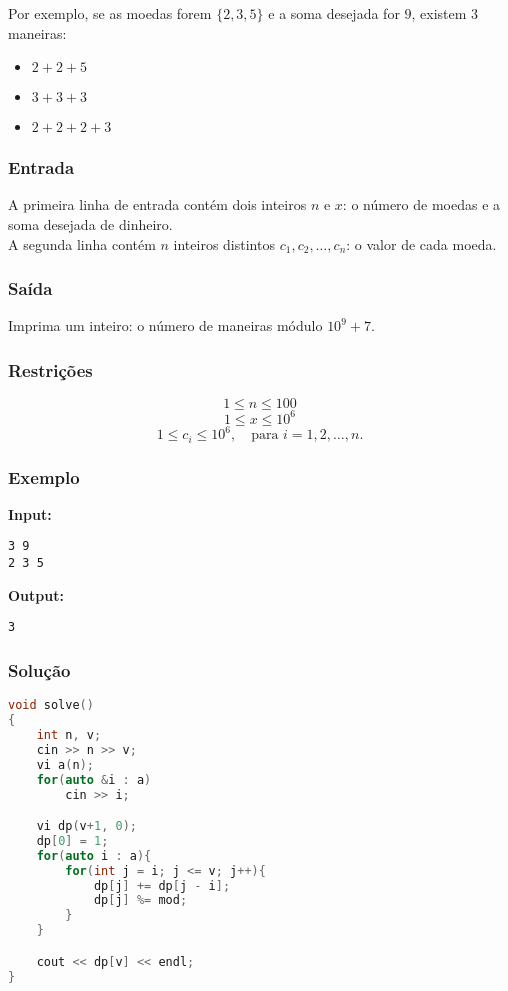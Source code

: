 Por exemplo, se as moedas forem \(\{2,3,5\}\) e a soma desejada for \(9\), existem \(3\) maneiras:
\begin{itemize}
    \item \(2+2+5\)
    \item \(3+3+3\)
    \item \(2+2+2+3\)
\end{itemize}

\subsubsection*{Entrada}
A primeira linha de entrada contém dois inteiros \( n \) e \( x \): o número de moedas e a soma desejada de dinheiro.\\  
A segunda linha contém \( n \) inteiros distintos \( c_1, c_2, \dots, c_n \): o valor de cada moeda.

\subsubsection*{Saída}
Imprima um inteiro: o número de maneiras módulo \( 10^9+7 \).

\subsubsection*{Restrições}
\[
1 \le n \le 100
\]
\[
1 \le x \le 10^6
\]
\[
1 \le c_i \le 10^6,\quad \text{para } i = 1, 2, \dots, n.
\]

\subsubsection*{Exemplo}

\textbf{Input:}
\begin{verbatim}
3 9
2 3 5
\end{verbatim}

\textbf{Output:}
\begin{verbatim}
3
\end{verbatim}

\subsubsection*{Solução}
\begin{lstlisting}[language=C++]
void solve()
{
    int n, v; 
    cin >> n >> v;
    vi a(n);
    for(auto &i : a) 
        cin >> i;

    vi dp(v+1, 0);
    dp[0] = 1;
    for(auto i : a){
        for(int j = i; j <= v; j++){
            dp[j] += dp[j - i];
            dp[j] %= mod;
        }
    }

    cout << dp[v] << endl;
}
\end{lstlisting}

